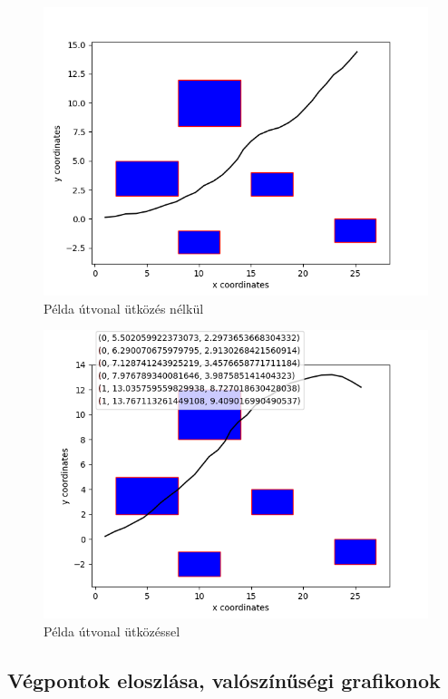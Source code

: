 \begin{figure}[h!]
\centering
\includegraphics[scale=0.75]{images/example_nocollision.png}
\caption{Példa útvonal ütközés nélkül}
\label{fig:example_nocollision}
\end{figure}



\begin{figure}[h!]
\centering
\includegraphics[scale=0.75]{images/example_collision.png}
\caption{Példa útvonal ütközéssel}
\label{fig:example_collision}
\end{figure}

\newpage

\subsection{Végpontok eloszlása, valószínűségi grafikonok}


